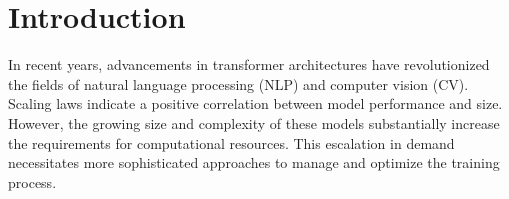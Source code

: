 \documentclass[sigplan,screen]{acmart}
\begin{document}



\maketitle

\section{Introduction}

In recent years, advancements in transformer architectures have revolutionized the fields of natural language processing (NLP) and computer vision (CV). Scaling laws indicate a positive correlation between model performance and size. However, the growing size and complexity of these models substantially increase the requirements for computational resources. This escalation in demand necessitates more sophisticated approaches to manage and optimize the training process. 
\end{document}
